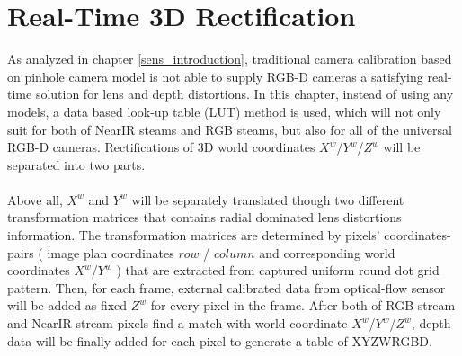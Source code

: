 %
\chapter{Real-Time 3D Rectification} %
\label{sens_Rectification} %
As analyzed in chapter \ref{sens_introduction}, traditional camera calibration based on pinhole camera model is not able to supply RGB-D cameras a satisfying real-time solution for lens and depth distortions. In this chapter, instead of using any models, a data based look-up table (LUT) method is used, which will not only suit for both of NearIR steams and RGB steams, but also for all of the universal RGB-D cameras. Rectifications of 3D world coordinates \(X^{w}\)/\(Y^{w}\)/\(Z^{w}\) will be separated into two parts. 
\\\\%
Above all, \(X^{w}\) and \(Y^{w}\) will be separately translated though two different transformation matrices that contains radial dominated lens distortions information. The transformation matrices are determined by pixels' coordinates-pairs ( image plan coordinates \(row\) / \(column\) and corresponding world coordinates \(X^{w}\)/\(Y^{w}\) ) that are extracted from captured uniform round dot grid pattern. Then, for each frame, external calibrated data from optical-flow sensor will be added as fixed \(Z^{w}\) for every pixel in the frame. After both of RGB stream and NearIR stream pixels find a match with world coordinate \(X^{w}\)/\(Y^{w}\)/\(Z^{w}\), depth data will be finally added for each pixel to generate a table of XYZWRGBD.

